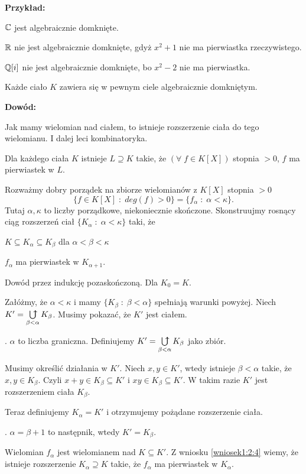 \textbf{Przykład:}

\indent \point $\mathbb{C}$ jest algebraicznie domknięte.

\indent \point $\mathbb{R}$ nie jest algebraicznie domknięte, gdyż $x^2+1$ nie ma pierwiastka rzeczywistego.

\indent \point $\mathbb{Q}[i]$ nie jest algebraicznie domknięte, bo $x^2-2$ nie ma pierwiastka.

\begin{tw}
    \label{tw:2.3}
    Każde ciało $K$ zawiera się w pewnym ciele algebraicznie domkniętym.
\end{tw}

\textbf{Dowód:}

Jak mamy wielomian nad ciałem, to istnieje rozszerzenie ciała do tego wielomianu. I dalej leci kombinatoryka.

 Dla każdego ciała $K$ istnieje $L\supseteq K$ takie, że $(\forall\;f\in K[X])$ stopnia $>0$, $f$ ma pierwiastek w $L$.

Rozważmy dobry porządek na zbiorze wielomianów z $K[X]$ stopnia $>0$
$$\{f\in K[X]\;:\;deg(f)>0\}=\{f_\alpha\;:\;\alpha< \kappa\}.$$
Tutaj $\alpha,\kappa$ to liczby porządkowe, niekoniecznie skończone. Skonstruujmy rosnący ciąg rozszerzeń  ciał $\{K_\alpha\;:\;\alpha< \kappa\}$ taki, że 

\indent \point $K\subseteq K_\alpha\subseteq K_\beta$ dla $\alpha<\beta< \kappa$

\indent \point $f_\alpha$ ma pierwiastek w $K_{\alpha+1}$.

Dowód przez indukcję pozaskończoną. Dla $K_0=K$. 

Załóżmy, że $\alpha<\kappa$ i mamy $\{K_\beta\;:\;\beta<\alpha\}$ spełniają warunki powyżej.  Niech $K'=\ubigcup\limits_{\beta<\alpha}K_\beta$. Musimy pokazać, że $K'$ jest ciałem.

. $\alpha$ to liczba graniczna. Definiujemy $K'=\ubigcup\limits_{\beta<\alpha}K_\beta$ jako zbiór. 

Musimy określić działania w $K'$. Niech $x,y\in K'$, wtedy istnieje $\beta<\alpha$ takie, że $x,y\in K_\beta$. Czyli $x+y\in K_\beta\subseteq K'$ i $xy\in K_\beta\subseteq K'$. W takim razie $K'$ jest rozszerzeniem ciała $K_\beta$.

Teraz definiujemy $K_\alpha=K'$ i otrzymujemy pożądane rozszerzenie ciała.

. $\alpha=\beta+1$ to następnik, wtedy $K'=K_\beta$. 

Wielomian $f_\alpha$ jest wielomianem nad $K\subseteq K'$. Z wniosku \ref{wniosek1:2:4} wiemy, że istnieje rozszerzenie $K_\alpha\supseteq K$ takie, że $f_\alpha$ ma pierwiastek w $K_\alpha$.

